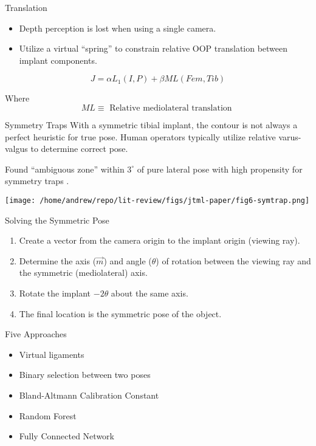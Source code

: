 \documentclass[presentation, aspectratio=1610]{beamer}
\begin{document}
\begin{frame}[label={sec:orgd9c2a30}]{Translation}
\begin{itemize}
\item Depth perception is lost when using a single camera.
\item Utilize a virtual ``spring'' to constrain relative OOP translation between implant components.
\end{itemize}

\begin{equation*}
  J = \alpha L_{1}(I,P) + \beta ML(Fem,Tib)
\end{equation*}

Where
\begin{equation*}
  ML \equiv \text{ Relative mediolateral translation }
\end{equation*}
\end{frame}

\begin{frame}[label={sec:org0654ebf}]{Symmetry Traps}
With a symmetric tibial implant, the contour is not always a perfect heuristic for true pose. Human operators typically utilize relative varus-valgus to determine correct pose.

Found ``ambiguous zone'' within \(3^{\circ}\) of pure lateral pose with high propensity for symmetry traps \autocite{jensenJointTrackMachine2022}.

\begin{center}
\texttt{[image: /home/andrew/repo/lit-review/figs/jtml-paper/fig6-symtrap.png]}
\end{center}
\end{frame}
\begin{frame}[label={sec:org6e467a8}]{Solving the Symmetric Pose}
\begin{enumerate}
\item Create a vector from the camera origin to the implant origin (viewing ray).
\item Determine the axis (\(\vec{m}\)) and angle (\(\theta\)) of rotation between the viewing ray and the symmetric (mediolateral) axis.
\item Rotate the implant \(-2\theta\) about the same axis.
\item The final location is the symmetric pose of the object.
\end{enumerate}
\end{frame}

\begin{frame}[label={sec:org0d070e7}]{Five Approaches}
\begin{itemize}
\item Virtual ligaments
\item Binary selection between two poses
\item Bland-Altmann Calibration Constant
\item Random Forest
\item Fully Connected Network
\end{itemize}
\end{frame}
\end{document}
